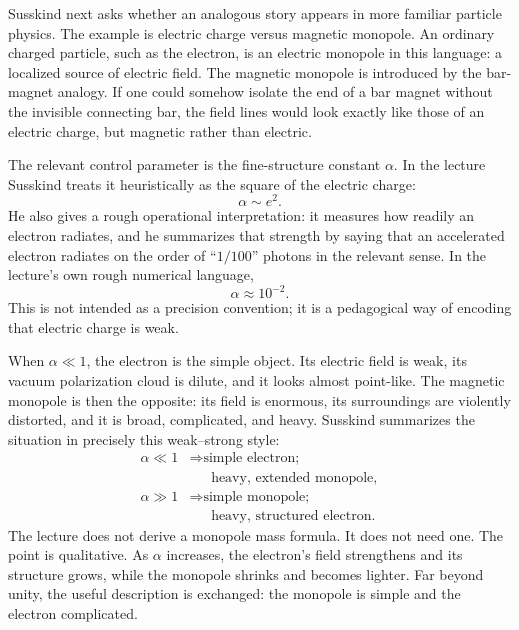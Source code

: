 Susskind next asks whether an analogous story appears in more familiar particle physics. The example is electric charge versus magnetic monopole. An ordinary charged particle, such as the electron, is an electric monopole in this language: a localized source of electric field. The magnetic monopole is introduced by the bar-magnet analogy. If one could somehow isolate the end of a bar magnet without the invisible connecting bar, the field lines would look exactly like those of an electric charge, but magnetic rather than electric.

The relevant control parameter is the fine-structure constant \(\alpha\). In the lecture Susskind treats it heuristically as the square of the electric charge:
\begin{equation}
\alpha \sim e^2.
\end{equation}
He also gives a rough operational interpretation: it measures how readily an electron radiates, and he summarizes that strength by saying that an accelerated electron radiates on the order of ``\(1/100\)'' photons in the relevant sense. In the lecture's own rough numerical language,
\begin{equation}
\alpha \approx 10^{-2}.
\end{equation}
This is not intended as a precision convention; it is a pedagogical way of encoding that electric charge is weak.


When \(\alpha\ll 1\), the electron is the simple object. Its electric field is weak, its vacuum polarization cloud is dilute, and it looks almost point-like. The magnetic monopole is then the opposite: its field is enormous, its surroundings are violently distorted, and it is broad, complicated, and heavy. Susskind summarizes the situation in precisely this weak--strong style:
\begin{equation}
\begin{aligned}
\alpha \ll 1
&\Rightarrow \text{simple electron;}\\
&\phantom{\Rightarrow{}}\text{heavy, extended monopole},\\
\alpha \gg 1
&\Rightarrow \text{simple monopole;}\\
&\phantom{\Rightarrow{}}\text{heavy, structured electron}.
\end{aligned}
\end{equation}
The lecture does not derive a monopole mass formula. It does not need one. The point is qualitative. As \(\alpha\) increases, the electron's field strengthens and its structure grows, while the monopole shrinks and becomes lighter. Far beyond unity, the useful description is exchanged: the monopole is simple and the electron complicated.

